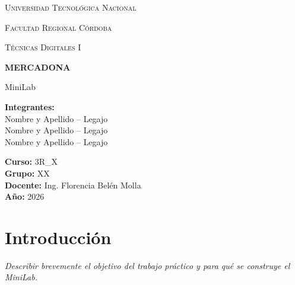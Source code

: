 \documentclass[12pt,a4paper]{article}
\begin{document}
\begin{titlepage}
    \centering

    {\scshape\LARGE Universidad Tecnológica Nacional \par}
    \vspace{0.3cm}
    {\scshape\Large Facultad Regional Córdoba \par}
    \vspace{1.5cm}

    {\scshape\Large Técnicas Digitales I \par}
    \vspace{2cm}

    {\Huge\bfseries MERCADONA \par}
    \vspace{0.5cm}
    {\LARGE MiniLab \par}

    \vspace{2cm}

    \begin{flushleft}
    \textbf{Integrantes:} \\
    Nombre y Apellido -- Legajo \\
    Nombre y Apellido -- Legajo \\
    Nombre y Apellido -- Legajo \\

    \vspace{0.5cm}

    \textbf{Curso:} 3R\_X \\
    \textbf{Grupo:} XX \\
    \textbf{Docente:} Ing. Florencia Belén Molla \\
    \textbf{Año:} 2026 \\
    \end{flushleft}

    \vfill

\end{titlepage}
\thispagestyle{empty}

\vspace{1cm}

\tableofcontents
\newpage

\section{Introducción}

\textit{Describir brevemente el objetivo del trabajo práctico y para qué se construye el MiniLab.}
\end{document}
